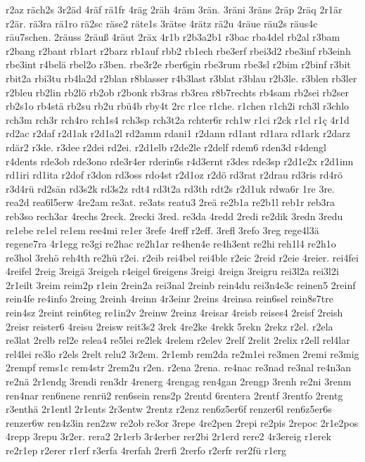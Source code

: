 {r2az
räch2s
3r2äd
4räf
rä1fr
4räg
2räh
4räm
3rän.
3räni
3räns
2räp
2räq
2r1är
r2är.
rä3ra
rä1ro
rä2sc
räse2
räte1s
3rätse
4rätz
rä2u
4räue
räu2s
räus4c
räu7schen.
2räuss
2räuß
4räut
2räx
4r1b
r2b3a2b1
r3bac
rba4del
rb2al
r3bam
r2bang
r2bant
rb1art
r2barz
rb1auf
rbb2
rb1ech
rbe3erf
rbei3d2
rbe3inf
rb3einh
rbe3int
r4belä
rbel2o
r3ben.
rbe3r2e
rber6gin
rbe3rum
rbe3sl
r2bim
r2binf
r3bit
rbit2a
rbi3tu
rb4la2d
r2blan
r8blasser
r4b3last
r3blat
r3blau
r2b3le.
r3blen
rb3ler
r2bleu
rb2lin
rb2lö
rb2ob
r2bonk
rb3ras
rb3rea
r8b7rechts
rb4sam
rb2sei
rb2ser
rb2s1o
rb4stä
rb2su
rb2u
rbü4b
rby4t
2rc
r1ce
r1che.
r1chen
r1ch2i
rch3l
r3chlo
rch3m
rch3r
rch4ro
rch1s4
rch3sp
rch3t2a
rchter6r
rch1w
r1ci
r2ck
r1cl
r1ç
4r1d
rd2ac
r2daf
r2d1ak
r2d1a2l
rd2amm
rdani1
r2dann
rd1ant
rd1ara
rd1ark
r2darz
rdär2
r3de.
r3dee
r2dei
rd2ei.
r2d1elb
r2de2le
r2delf
rdem6
rden3d
r4dengl
r4dents
rde3ob
rde3ono
rde3r4er
rderin6s
r4d3ernt
r3des
rde3sp
r2d1e2x
r2d1inn
rd1iri
rd1ita
r2dof
r3don
rd3oss
rdo4st
r2d1oz
r2dö
rd3rat
r2drau
rd3ris
rd4rö
r3d4rü
rd2sän
rd3s2k
rd3s2z
rdt4
rd3t2a
rd3th
rdt2s
r2d1uk
rdwa6r
1re
3re.
rea2d
rea6l5erw
4re2am
re3at.
re3ats
reatu3
2reä
re2b1a
re2b1l
reb1r
reb3ra
reb3so
rech3ar
4rechs
2reck.
2recki
3red.
re3da
4redd
2redi
re2dik
3redn
3redu
re1ebe
re1el
re1em
ree4mi
re1er
3refe
4reff
r2eff.
3refl
3refo
3reg
rege4l3ä
regene7ra
4r1egg
re3gi
re2hac
re2h1ar
re4hen4e
re4h3ent
re2hi
reh1l4
re2h1o
re3hol
3rehö
reh4th
re2hü
r2ei.
r2eib
rei4bel
rei4ble
r2eic
2reid
r2eie
4reier.
rei4fei
4reifel
2reig
3reigä
3reigeh
r4eigel
6reigens
3reigi
4reign
3reigru
rei3l2a
rei3l2i
2r1eilt
3reim
reim2p
r1ein
2rein2a
rei3nal
2reinb
rein4du
rei3n4e3c
reinen5
2reinf
rein4fe
re4info
2reing
2reinh
4reinn
4r3einr
2reins
4reinsa
rein6sel
rein8s7tre
rein4sz
2reint
rein6teg
re1in2v
2reinw
2reinz
4reisar
4reisb
reises4
2reisf
2reish
2reisr
reister6
4reisu
2reisw
reit3s2
3rek
4re2ke
4rekk
5rekn
2rekz
r2el.
r2ela
re3lat
2relb
rel2e
relea4
re5lei
re2lek
4relem
r2elev
2relf
2relit
2relix
r2ell
rel4lar
rel4lei
re3lo
r2els
2relt
relu2
3r2em.
2r1emb
rem2da
re2m1ei
re3men
2remi
re3mig
2rempf
rems1c
rem4str
2rem2u
r2en.
r2ena
2rena.
re4nac
re3nad
re3nal
re4n3an
re2nä
2r1endg
3rendi
ren3dr
4renerg
4rengag
ren4gan
2rengp
3renh
re2ni
3renm
ren4nar
ren6nene
renrü2
ren6sein
rens2p
2rentd
6rentera
2rentf
3rentfo
2rentg
r3enthä
2r1entl
2r1ents
2r3entw
2rentz
r2enz
ren6z5er6f
renzer6l
ren6z5er6s
renzer6w
ren4z3in
ren2zw
re2ob
re3or
3repe
4re2pen
2repi
re2pis
2repoc
2r1e2pos
4repp
3repu
3r2er.
rera2
2r1erb
3r4erber
rer2bi
2r1erd
rere2
4r3ereig
r1erek
re2r1ep
r2erer
r1erf
r3erfa
4rerfah
2rerfi
2rerfo
r2erfr
rer2fü
r1erg
}
